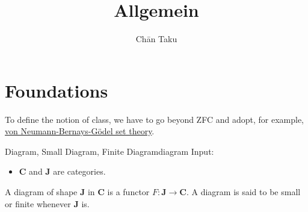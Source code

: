 \documentclass{article}
\title{Allgemein}
\author{Ch\=an Taku}
\begin{document}
\maketitle

\section{Foundations}

To define the notion of class, we have to go beyond ZFC and adopt, for example, \href{https://en.wikipedia.org/wiki/Von_Neumann%E2%80%93Bernays%E2%80%93G%C3%B6del_set_theory}{von Neumann-Bernays-G\"odel set theory}.

\begin{definition}{Diagram, Small Diagram, Finite Diagram}{diagram}
    Input:
    \begin{itemize}
        \item $\mathbf{C}$ and $\mathbf{J}$ are categories.
    \end{itemize}
    A diagram of shape $\mathbf{J}$ in $\mathbf{C}$ is a functor $F:\mathbf{J}\rightarrow\mathbf{C}$.
    A diagram is said to be small or finite whenever $\mathbf{J}$ is.
\end{definition}
\end{document}
